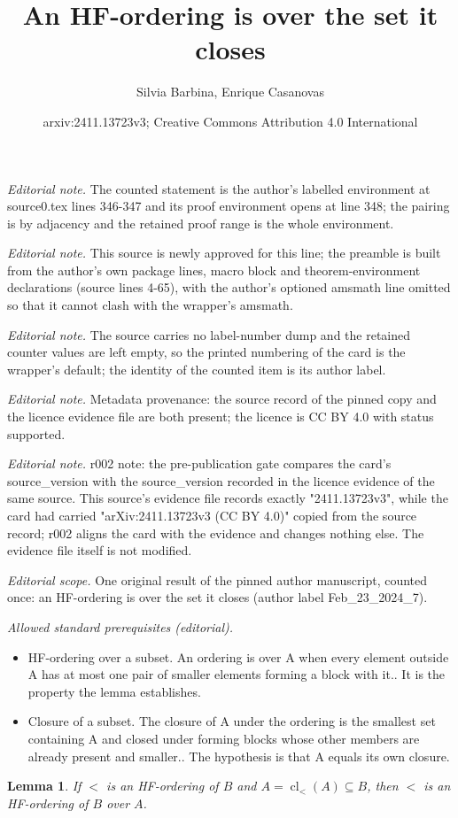 \documentclass[10pt,a4paper]{article}
\title{An HF-ordering is over the set it closes}
\author{Silvia Barbina, Enrique Casanovas}
\date{arxiv:2411.13723v3; Creative Commons Attribution 4.0 International}
\DeclareMathOperator{\cl}{cl}
\theoremstyle{note}
\newtheorem{lemma}[thm]{Lemma}
\begin{document}
\maketitle
\noindent\textit{Editorial note.} The counted statement is the author's labelled environment at source0.tex lines 346-347 and its proof environment opens at line 348; the pairing is by adjacency and the retained proof range is the whole environment.\par\medskip
\noindent\textit{Editorial note.} This source is newly approved for this line; the preamble is built from the author's own package lines, macro block and theorem-environment declarations (source lines 4-65), with the author's optioned amsmath line omitted so that it cannot clash with the wrapper's amsmath.\par\medskip
\noindent\textit{Editorial note.} The source carries no label-number dump and the retained counter values are left empty, so the printed numbering of the card is the wrapper's default; the identity of the counted item is its author label.\par\medskip
\noindent\textit{Editorial note.} Metadata provenance: the source record of the pinned copy and the licence evidence file are both present; the licence is CC BY 4.0 with status supported.\par\medskip
\noindent\textit{Editorial note.} r002 note: the pre-publication gate compares the card's source\_version with the source\_version recorded in the licence evidence of the same source. This source's evidence file records exactly "2411.13723v3", while the card had carried "arXiv:2411.13723v3 (CC BY 4.0)" copied from the source record; r002 aligns the card with the evidence and changes nothing else. The evidence file itself is not modified.\par\medskip
\noindent\textit{Editorial scope.} One original result of the pinned author manuscript, counted once: an HF-ordering is over the set it closes (author label Feb\_23\_2024\_7).\par\medskip
\noindent\textit{Allowed standard prerequisites (editorial).}\begin{itemize}
\item HF-ordering over a subset. An ordering is over A when every element outside A has at most one pair of smaller elements forming a block with it.. It is the property the lemma establishes.
\item Closure of a subset. The closure of A under the ordering is the smallest set containing A and closed under forming blocks whose other members are already present and smaller.. The hypothesis is that A equals its own closure.
\end{itemize}\medskip
\begin{lemma}\label{Feb_23_2024_7} If $<$ is an HF-ordering of $B$  and $A=\cl_<(A)\subseteq B$, then  $<$ is an HF-ordering of $B$ over $A$. 
\end{lemma}
\end{document}

